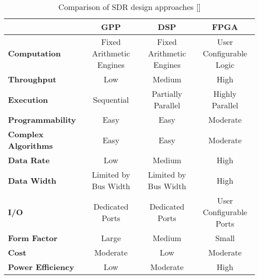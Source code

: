 \begin{table}[ht]
  \caption{Comparison of SDR design approaches [\citeauthor{DBLP:journals/corr/abs-1804-06564}]}
  \label{table:sdr_approach_comparison}
  \centering
  \begin{adjustbox}{width=1\textwidth}
  \begin{tabular}{>{\bfseries}l|c|c|c}
    \toprule
    & \textbf{GPP} & \textbf{DSP} & \textbf{FPGA} \\
    \midrule
    Computation        & Fixed Arithmetic Engines & Fixed Arithmetic Engines & User Configurable Logic\\
    Throughput         & Low                      & Medium                   & High\\
    Execution          & Sequential               & Partially Parallel       & Highly Parallel\\
    Programmability    & Easy                     & Easy                     & Moderate\\
    Complex Algorithms & Easy                     & Easy                     & Moderate\\
    Data Rate          & Low                      & Medium                   & High\\
    Data Width         & Limited by Bus Width     & Limited by Bus Width     & High\\
    I/O                & Dedicated Ports          & Dedicated Ports          & User Configurable Ports\\
    Form Factor        & Large                    & Medium                   & Small\\
    Cost               & Moderate                 & Low                      & Moderate\\
    Power Efficiency   & Low                      & Moderate                 & High\\
    \bottomrule
  \end{tabular}
  \end{adjustbox}
\end{table}
